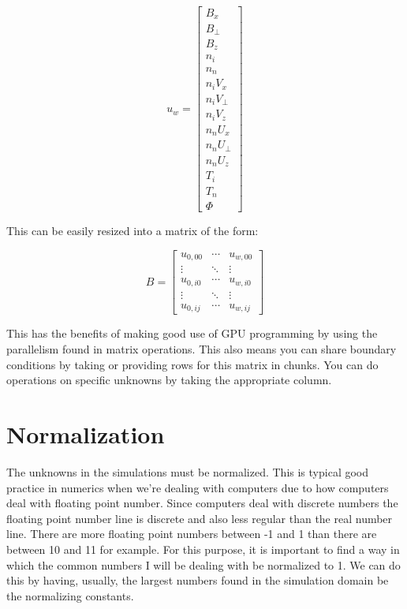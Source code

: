 \documentclass[12pt,upcase]{umlthesis}
\begin{document}
\begin{equation}
	u_w = 
	\begin{bmatrix}
		B_x \\
		B_{\perp} \\
		B_z \\
		n_i \\
		n_n \\
		n_i V_x \\
		n_i V_{\perp} \\
		n_i V_z \\
		n_n U_x \\
		n_n U_{\perp} \\
		n_n U_z \\
		T_i \\
		T_n \\
		\Phi
	\end{bmatrix}
\end{equation}

This can be easily resized into a matrix of the form:

\begin{equation}
	B =
	\begin{bmatrix}
		u_{0,00} & \cdots  & u_{w,00} \\
		\vdots   & \ddots & \vdots \\
		u_{0,i0} & \cdots & u_{w,i0} \\
		\vdots   & \ddots & \vdots \\
		u_{0,ij} & \cdots  & u_{w,ij}
	\end{bmatrix}
\end{equation}

This has the benefits of making good use of GPU programming by using the parallelism found in matrix operations. This also means you can share boundary conditions by taking or providing rows for this matrix in chunks. You can do operations on specific unknowns by taking the appropriate column.

\section{Normalization}\label{sec:normalization}

The unknowns in the simulations must be normalized. This is typical good practice in numerics when we're dealing with computers due to how computers deal with floating point number. Since computers deal with discrete numbers the floating point number line is discrete and also less regular than the real number line. There are more floating point numbers between -1 and 1 than there are between 10 and 11 for example. For this purpose, it is important to find a way in which the common numbers I will be dealing with be normalized to 1. We can do this by having, usually, the largest numbers found in the simulation domain be the normalizing constants.
\end{document}
